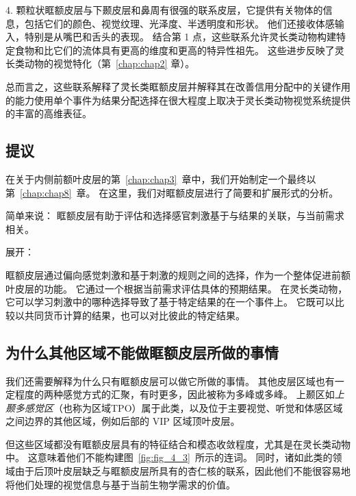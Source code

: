 4. 颗粒状眶额皮层与下颞皮层和鼻周有很强的联系皮层，它提供有关物体的信息，包括它们的颜色、视觉纹理、光泽度、半透明度和形状。
他们还接收体感输入，特别是从嘴巴和舌头的表现。
结合第 1 点，这些联系允许灵长类动物构建特定食物和比它们的流体具有更高的维度和更高的特异性祖先。
这些进步反映了灵长类动物的视觉特化（第~\ref{chap:chap2} 章）。\par


总而言之，这些联系解释了灵长类眶额皮层并解释其在改善信用分配中的关键作用的能力使用单个事件为结果分配选择在很大程度上取决于灵长类动物视觉系统提供的丰富的高维表征。



\subsection{提议}

在关于内侧前额叶皮层的第~\ref{chap:chap3}~章中，我们开始制定一个最终以第~\ref{chap:chap8}~章。
在这里，我们对眶额皮层进行了简要和扩展形式的分析。\par


简单来说：
眶额皮层有助于评估和选择感官刺激基于与结果的关联，与当前需求相关。\par


展开：\par
眶额皮层通过偏向感觉刺激和基于刺激的规则之间的选择，作为一个整体促进前额叶皮层的功能。
它通过一个根据当前需求评估具体的预期结果。
在灵长类动物，它可以学习刺激中的哪种选择导致了基于特定结果的在一个事件上。
它既可以比较以共同货币计算的结果，也可以对比彼此的特定结果。\par



\subsection{为什么其他区域不能做眶额皮层所做的事情}

我们还需要解释为什么只有眶额皮层可以做它所做的事情。 
其他皮层区域也有一定程度的两种感觉方式的汇聚，有时更多，因此被称为多峰或多峰。
上颞区如\textit{上颞多感觉区}（也称为区域TPO）属于此类\cite{seltzer1994parietal}，以及位于主要视觉、听觉和体感区域之间边界的其他区域，例如后部的 VIP 区域顶叶皮层\cite{schlack2005multisensory}。\par


但这些区域都没有眶额皮层具有的特征结合和模态收敛程度，尤其是在灵长类动物中。
这意味着他们不能构建图~\ref{fig:fig_4_3}~所示的连词。
同时，诸如此类的领域由于后顶叶皮层缺乏与眶额皮层所具有的杏仁核的联系，因此他们不能很容易地将他们处理的视觉信息与基于当前生物学需求的价值。\par



